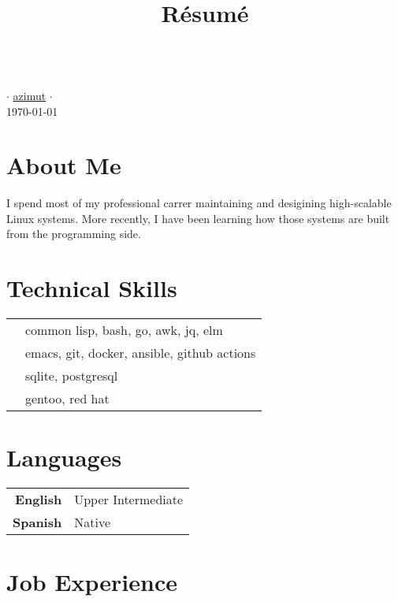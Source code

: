\documentclass[11pt]{article}
\renewcommand{\maketitle}{
  \begin{center}{\huge\bfseries\theauthor} \\
    \vspace{.25em}
    {\faEnvelope} \href {mailto:\MAILTO} {\expandafter\randomize\expandafter{\MAILTO}} $\cdot$
    {\faGithub} \href {https://github.com/azimut} {azimut} $\cdot$
    {\faLinkedin} \href {https://www.linkedin.com/in/\LINKEDIN} {\LINKEDIN} \\
    \vspace{.25em}
    \today
  \end{center}
}
\begin{document}
\title{R\'esum\'e}
\author{\FULLNAME}

\maketitle


\section{{\Large{\faUser}} About Me}

I spend most of my professional carrer maintaining and desigining high-scalable Linux systems. More recently, I have been learning how those systems are built from the programming side. \\

\begin{multicols}{2}
  \section{{\Large{\faTools}} Technical Skills}
  \begin{tabular}{@{}cl@{}}
    \hspace{.1em} \raisebox{-0.2\height}{\faCode}     & common lisp, bash, go, awk, jq, elm \\
    \hspace{.1em} \raisebox{-0.2\height}{\faWrench}   & emacs, git, docker, ansible, github actions \\
    \hspace{.1em} \raisebox{-0.2\height}{\faDatabase} & sqlite, postgresql \\
    \hspace{.1em} \raisebox{-0.2\height}{\faLinux}    & gentoo, red hat
  \end{tabular}
  \columnbreak
  \section{{\Large{\faLanguage}} Languages}
  \begin{tabular}{@{}rl@{}}
    \hspace{.1em} \textbf{English} & Upper Intermediate \\
    \hspace{.1em} \textbf{Spanish} & Native \\
  \end{tabular}
\end{multicols}


\section{{\Large{\faBriefcase}} Job Experience}
\end{document}
